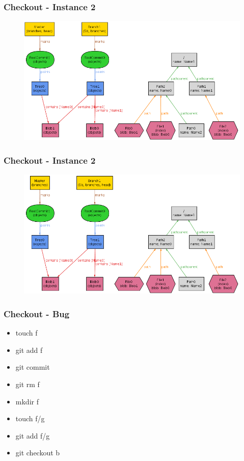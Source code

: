 \documentclass{beamer}
\begin{document}
\begin{frame}[fragile]
   \frametitle{Checkout - Instance 2}
      \begin{figure}
         \centering
         \includegraphics[width=1\textwidth]{images/checkout2_1.png}
      \end{figure}
\end{frame}

\begin{frame}[fragile]
   \frametitle{Checkout - Instance 2}
      \begin{figure}
         \centering
         \includegraphics[width=1\textwidth]{images/checkout2_2.png}
      \end{figure}
\end{frame}

\begin{frame}
	\frametitle{Checkout - Bug}
	\begin{itemize}
	   \item touch f \pause
	   \item git add f \pause
	   \item git commit \pause
	   \item git rm f \pause
	   \item mkdir f \pause
	   \item touch f/g \pause
	   \item git add f/g \pause 
	   \item git checkout b 
	\end{itemize}
\end{frame}
\end{document}
